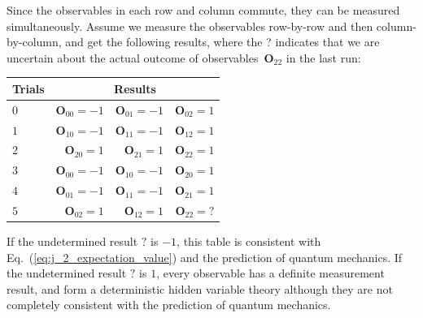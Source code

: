 \documentclass[english,reprint, aps, prl,superscriptaddress, showpacs,
showkeys, longbibliography, amsmath, amssymb, floatfix]{revtex4-1}
\theoremstyle{plain}
\theoremstyle{definition}
\begin{document}
Since the observables in each row and column commute, they can be
measured simultaneously. Assume we measure the observables row-by-row
and then column-by-column, and get the following results, where the
? indicates that we are uncertain about the actual outcome of observables~$\mathbf{O}_{22}$
in the last run:
\begin{center}
\begin{tabular}{l@{\qquad}r@{\qquad}r@{\qquad}r}
\toprule 
\addlinespace
Trials & \multicolumn{3}{c}{Results}\tabularnewline
\midrule
\midrule 
\addlinespace
$0$ & $\mathbf{O}_{00}=-1$ & $\mathbf{O}_{01}=-1$ & $\mathbf{O}_{02}=1$\tabularnewline
\midrule 
\addlinespace
$1$ & $\mathbf{O}_{10}=-1$ & $\mathbf{O}_{11}=-1$ & $\mathbf{O}_{12}=1$\tabularnewline
\midrule 
\addlinespace
$2$ & $\mathbf{O}_{20}=1$ & $\mathbf{O}_{21}=1$ & $\mathbf{O}_{22}=1$\tabularnewline
\midrule 
\addlinespace
$3$ & $\mathbf{O}_{00}=-1$ & $\mathbf{O}_{10}=-1$ & $\mathbf{O}_{20}=1$\tabularnewline
\midrule 
\addlinespace
$4$ & $\mathbf{O}_{01}=-1$ & $\mathbf{O}_{11}=-1$ & $\mathbf{O}_{21}=1$\tabularnewline
\midrule 
\addlinespace
$5$ & $\mathbf{O}_{02}=1$ & $\mathbf{O}_{12}=1$ & $\mathbf{O}_{22}=?$\tabularnewline
\bottomrule
\end{tabular}
\par\end{center}

If the undetermined result $?$ is $-1$, this table is consistent
with Eq.~(\ref{eq:j_2_expectation_value}) and the prediction of
quantum mechanics. If the undetermined result $?$ is $1$, every
observable has a definite measurement result, and form a deterministic
hidden variable theory although they are not completely consistent
with the prediction of quantum mechanics.
\end{document}
